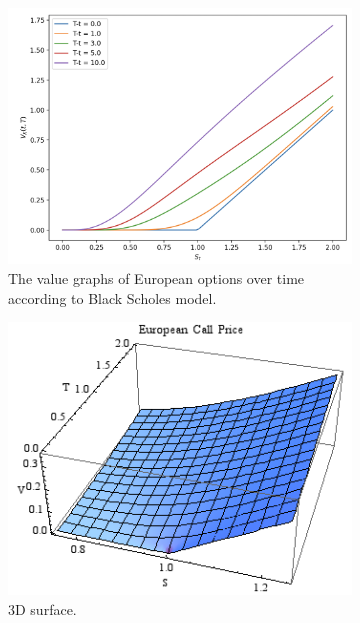 \documentclass{article}
\begin{document}
  \begin{figure}[H]
    \centering
    \begin{subfigure}[b]{0.48\textwidth}
    \centering
      \includegraphics[width=\textwidth]{img/value_graph_over_time.png}
      \caption{The value graphs of European options over time according to Black Scholes model. }
      \label{fig:value_graph_over_time}
    \end{subfigure}
    \hfill 
    \begin{subfigure}[b]{0.48\textwidth}
    \centering
      \includegraphics[width=\textwidth]{img/option_surface.png}
      \caption{3D surface. }
      \label{fig:option_surface}
    \end{subfigure}
    \caption{}
    \label{fig:option_pricing_graphs}
  \end{figure}
  
\end{document}
